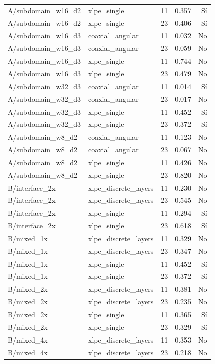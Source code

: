 \begin{longtable}{L{4cm}L{3.5cm}rrr}
A/subdomain\_w16\_d2 & xlpe\_single & 11 & 0.357 & Sí\\
A/subdomain\_w16\_d2 & xlpe\_single & 23 & 0.406 & Sí\\
A/subdomain\_w16\_d3 & coaxial\_angular & 11 & 0.032 & No\\
A/subdomain\_w16\_d3 & coaxial\_angular & 23 & 0.059 & No\\
A/subdomain\_w16\_d3 & xlpe\_single & 11 & 0.744 & No\\
A/subdomain\_w16\_d3 & xlpe\_single & 23 & 0.479 & No\\
A/subdomain\_w32\_d3 & coaxial\_angular & 11 & 0.014 & Sí\\
A/subdomain\_w32\_d3 & coaxial\_angular & 23 & 0.017 & No\\
A/subdomain\_w32\_d3 & xlpe\_single & 11 & 0.452 & Sí\\
A/subdomain\_w32\_d3 & xlpe\_single & 23 & 0.372 & Sí\\
A/subdomain\_w8\_d2 & coaxial\_angular & 11 & 0.123 & No\\
A/subdomain\_w8\_d2 & coaxial\_angular & 23 & 0.067 & No\\
A/subdomain\_w8\_d2 & xlpe\_single & 11 & 0.426 & No\\
A/subdomain\_w8\_d2 & xlpe\_single & 23 & 0.820 & No\\
B/interface\_2x & xlpe\_discrete\_layers & 11 & 0.230 & No\\
B/interface\_2x & xlpe\_discrete\_layers & 23 & 0.545 & No\\
B/interface\_2x & xlpe\_single & 11 & 0.294 & Sí\\
B/interface\_2x & xlpe\_single & 23 & 0.618 & Sí\\
B/mixed\_1x & xlpe\_discrete\_layers & 11 & 0.329 & No\\
B/mixed\_1x & xlpe\_discrete\_layers & 23 & 0.347 & No\\
B/mixed\_1x & xlpe\_single & 11 & 0.452 & Sí\\
B/mixed\_1x & xlpe\_single & 23 & 0.372 & Sí\\
B/mixed\_2x & xlpe\_discrete\_layers & 11 & 0.381 & No\\
B/mixed\_2x & xlpe\_discrete\_layers & 23 & 0.235 & No\\
B/mixed\_2x & xlpe\_single & 11 & 0.365 & Sí\\
B/mixed\_2x & xlpe\_single & 23 & 0.329 & Sí\\
B/mixed\_4x & xlpe\_discrete\_layers & 11 & 0.353 & No\\
B/mixed\_4x & xlpe\_discrete\_layers & 23 & 0.218 & No\\

\end{longtable}
